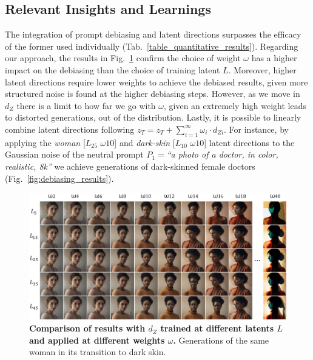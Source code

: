 \subsection{Relevant Insights and Learnings}
The integration of prompt debiasing and latent directions surpasses the efficacy of the former used individually (Tab.~\ref{table_quantitative_results}). Regarding our approach, the results in Fig.~\ref{fig:gallery_black_woman} confirm the choice of weight $\omega$ has a higher impact on the debiasing than the choice of training latent $L$. Moreover, higher latent directions require lower weights to achieve the debiased results, given more structured noise is found at the higher debiasing steps. However, as we move in $d_{Z}$ there is a limit to how far we go with $\omega$, given an extremely high weight leads to distorted generations, out of the distribution. Lastly, it is possible to linearly combine latent directions following $z_{T} = z_{T} + \sum_{i=1}^{\infty} \omega_{i} \cdot d_{Zi}$. For instance, by applying the \textit{woman} [$L_{25}$ $\omega10$] and \textit{dark-skin} [$L_{10}$ $\omega10$] latent directions to the Gaussian noise of the neutral prompt $P_{1}=$\textit{“a photo of a doctor, in
color, realistic, 8k”} we achieve generations of dark-skinned female doctors (Fig.~\ref{fig:debiasing_results}).

\begin{figure}[t]
  \centering
   \includegraphics[width=1\linewidth]{images/weight_latent_transition.png}

   \caption{\textbf{Comparison of results with $d_{Z}$ trained at different latents $L$ and applied at different weights $\omega$.} Generations of the same woman in its transition to dark skin.}
   \label{fig:gallery_black_woman}
\end{figure}






